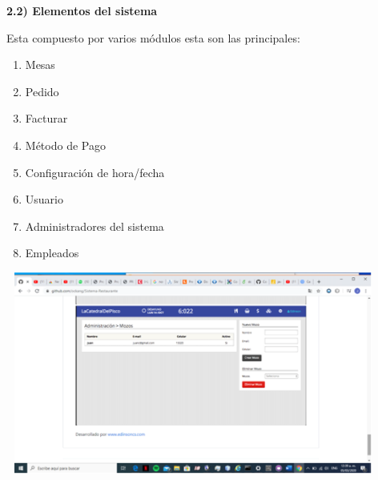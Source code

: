 \documentclass{article} %
\begin{document}
\noindent 

\noindent 

\noindent 

\noindent 

\noindent 

\noindent 

\noindent 

\noindent 

\noindent 

\noindent 

\noindent \textbf{}

\noindent \textbf{}

\noindent \textbf{}

\noindent \textbf{}

\noindent \textbf{2.2) Elementos del sistema}

\noindent Esta compuesto por varios m\'{o}dulos esta son las principales:

\begin{enumerate}
\item  Mesas 

\item  Pedido

\item  Facturar

\item  M\'{e}todo de Pago

\item  Configuraci\'{o}n de hora/fecha

\item  Usuario

\item  Administradores del sistema

\item  Empleados 
\end{enumerate}

\noindent 

\noindent 

\noindent \includegraphics*[width=4.86in, height=2.62in, keepaspectratio=false, trim=1.31in 0.94in 1.37in 0.68in]{image5}
\end{document}
